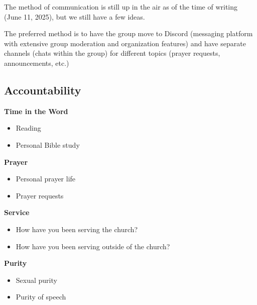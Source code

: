 \documentclass[12pt]{article}
\begin{document}
	The method of communication is still up in the air as of the time of
	writing (June 11, 2025), but we still have a few ideas.

	The preferred method is to have the group move to Discord (messaging
	platform with extensive group moderation and organization features) and
	have separate channels (chats within the group) for different topics
	(prayer requests, announcements, etc.)

\subsection{Accountability}

\textbf{Time in the Word}
\begin{itemize}

	\item Reading
	\item Personal Bible study

\end{itemize}

\textbf{Prayer}
\begin{itemize}

	\item Personal prayer life
	\item Prayer requests

\end{itemize}

\textbf{Service}
\begin{itemize}

	\item How have you been serving the church?
	\item How have you been serving outside of the church?
	
\end{itemize}

\textbf{Purity}
\begin{itemize}

	\item Sexual purity
	\item Purity of speech

\end{itemize}
\end{document}
